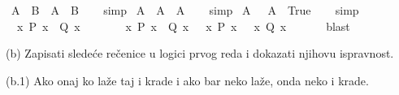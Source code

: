 \begin{isabellebody}
\begin{exercise}[subtitle=Zapisivanje logičkih formula]
\ {\isachardoublequoteopen}A\ {\isasymand}\ B\ {\isasymlongrightarrow}\ A\ {\isasymor}\ B{\isachardoublequoteclose}\isanewline
%
\isadelimproof
\ \ %
\endisadelimproof
%
\isatagproof
{}\isamarkupfalse%
\ simp%
\endisatagproof
{\isafoldproof}%
%
\isadelimproof
\isanewline
%
\endisadelimproof
\isanewline
{}\isamarkupfalse%
\ {\isachardoublequoteopen}A\ {\isasymand}\ A\ {\isasymlongleftrightarrow}\ A{\isachardoublequoteclose}\isanewline
%
\isadelimproof
\ \ %
\endisadelimproof
%
\isatagproof
{}\isamarkupfalse%
\ simp%
\endisatagproof
{\isafoldproof}%
%
\isadelimproof
\isanewline
%
\endisadelimproof
\isanewline
{}\isamarkupfalse%
\ {\isachardoublequoteopen}A\ {\isasymor}\ {\isasymnot}\ A\ {\isasymlongleftrightarrow}\ True{\isachardoublequoteclose}\isanewline
%
\isadelimproof
\ \ %
\endisadelimproof
%
\isatagproof
{}\isamarkupfalse%
\ simp%
\endisatagproof
{\isafoldproof}%
%
\isadelimproof
\isanewline
%
\endisadelimproof
\isanewline
{}\isamarkupfalse%
\ {\isachardoublequoteopen}{\isasymforall}\ x{\isachardot}{\kern0pt}\ P\ x\ {\isasymlongrightarrow}\ Q\ x{\isachardoublequoteclose}\isanewline
\ \ \isamarkupfalse%
\isanewline
%
\isadelimproof
\ \ %
\endisadelimproof
%
\isatagproof
{}\isamarkupfalse%
%
\endisatagproof
{\isafoldproof}%
%
\isadelimproof
\isanewline
%
\endisadelimproof
\isanewline
{}\isamarkupfalse%
\ {\isachardoublequoteopen}{\isacharparenleft}{\kern0pt}{\isasymforall}\ x{\isachardot}{\kern0pt}\ P\ x\ {\isasymlongrightarrow}\ Q\ x{\isacharparenright}{\kern0pt}\ {\isasymand}\ {\isacharparenleft}{\kern0pt}{\isasymexists}\ x{\isachardot}{\kern0pt}\ P\ x{\isacharparenright}{\kern0pt}\ {\isasymlongrightarrow}\ {\isacharparenleft}{\kern0pt}{\isasymexists}\ x{\isachardot}{\kern0pt}\ Q\ x{\isacharparenright}{\kern0pt}{\isachardoublequoteclose}\isanewline
\ \ \isamarkupfalse%
\isanewline
%
\isadelimproof
\ \ %
\endisadelimproof
%
\isatagproof
{}\isamarkupfalse%
\ blast%
\endisatagproof
{\isafoldproof}%
%
\isadelimproof
%
\endisadelimproof
%
\begin{isamarkuptext}%
(b) Zapisati sledeće rečenice u logici prvog reda i dokazati njihovu ispravnost.%
\end{isamarkuptext}\isamarkuptrue%
%
\begin{isamarkuptext}%
(b.1) Ako onaj ko laže taj i krade i ako bar neko laže, onda neko i krade.%
\end{isamarkuptext}\isamarkuptrue%
\isamarkupfalse%

\end{exercise}
\end{isabellebody}
